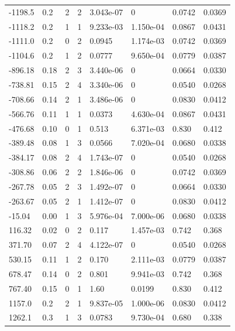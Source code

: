 \documentclass[preview]{standalone}
\begin{document}
{{\begin{tabular}{L{1.2cm}C{1.2cm} C{0.3cm}C{0.5cm} C{1.4cm}C{1.4cm} C{1.4cm}C{1.4cm}}
  -1198.5  &   0.2  & 2     &  2 &  3.043e-07  & 0  & 0.0742 &  0.0369   \\ 
  -1118.2  &   0.2  & 1     &  1 &  9.233e-03  & 1.150e-04  & 0.0867 &  0.0431   \\ 
  -1111.0  &   0.2  & 0     &  2 &  0.0945  & 1.174e-03  & 0.0742 &  0.0369   \\ 
  -1104.6  &   0.2  & 1     &  2 &  0.0777  & 9.650e-04  & 0.0779 &  0.0387   \\ 
  -896.18  &  0.18  & 2     &  3 &  3.440e-06  & 0  & 0.0664 &  0.0330   \\ 
  -738.81  &  0.15  & 2     &  4 &  3.340e-06  & 0  & 0.0540 &  0.0268   \\ 
  -708.66  &  0.14  & 2     &  1 &  3.486e-06  & 0  & 0.0830 &  0.0412   \\ 
  -566.76  &  0.11  & 1     &  1 &  0.0373  & 4.630e-04  & 0.0867 &  0.0431   \\ 
  -476.68  &  0.10  & 0     &  1 &  0.513  & 6.371e-03  & 0.830 &  0.412   \\ 
  -389.48  &  0.08  & 1     &  3 &  0.0566  & 7.020e-04  & 0.0680 &  0.0338   \\ 
  -384.17  &  0.08  & 2     &  4 &  1.743e-07  & 0  & 0.0540 &  0.0268   \\ 
  -308.86  &  0.06  & 2     &  2 &  1.846e-06  & 0  & 0.0742 &  0.0369   \\ 
  -267.78  &  0.05  & 2     &  3 &  1.492e-07  & 0  & 0.0664 &  0.0330   \\ 
  -263.67  &  0.05  & 2     &  1 &  1.412e-07  & 0  & 0.0830 &  0.0412   \\ 
  -15.04  &  0.00  & 1     &  3 &  5.976e-04  & 7.000e-06  & 0.0680 &  0.0338   \\ 
  116.32  &  0.02  & 0     &  2 &  0.117  & 1.457e-03  & 0.742 &  0.368   \\ 
  371.70  &  0.07  & 2     &  4 &  4.122e-07  & 0  & 0.0540 &  0.0268   \\ 
  530.15  &  0.11  & 1     &  2 &  0.170  & 2.111e-03  & 0.0779 &  0.0387   \\ 
  678.47  &  0.14  & 0     &  2 &  0.801  & 9.941e-03  & 0.742 &  0.368   \\ 
  767.40  &  0.15  & 0     &  1 &  1.60  & 0.0199  & 0.830 &  0.412   \\ 
  1157.0  &   0.2  & 2     &  1 &  9.837e-05  & 1.000e-06  & 0.0830 &  0.0412   \\ 
  1262.1  &   0.3  & 1     &  3 &  0.0783  & 9.730e-04  & 0.680 &  0.338   \\ 

\end{tabular}}}
\end{document}
